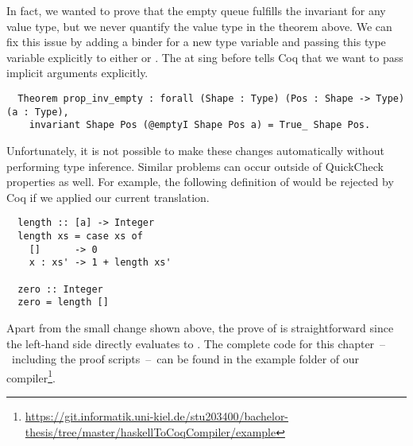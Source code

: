 In fact, we wanted to prove that the empty queue fulfills the invariant for any value type, but we never quantify the value type in the theorem above.
We can fix this issue by adding a binder for a new type variable and passing this type variable explicitly to either  or .
The at sing before  tells Coq that we want to pass implicit arguments explicitly.
\begin{verbatim}
  Theorem prop_inv_empty : forall (Shape : Type) (Pos : Shape -> Type) (a : Type),
    invariant Shape Pos (@emptyI Shape Pos a) = True_ Shape Pos.
\end{verbatim}
Unfortunately, it is not possible to make these changes automatically without performing type inference.
Similar problems can occur outside of QuickCheck properties as well.
For example, the following definition of  would be rejected by Coq if we applied our current translation.
\begin{verbatim}
  length :: [a] -> Integer
  length xs = case xs of
    []      -> 0
    x : xs' -> 1 + length xs'

  zero :: Integer
  zero = length []
\end{verbatim}
Apart from the small change shown above, the prove of  is straightforward since the left-hand side directly evaluates to .
The complete code for this chapter~--~including the proof scripts~--~can be found in the example folder of our compiler\footnote{\url{https://git.informatik.uni-kiel.de/stu203400/bachelor-thesis/tree/master/haskellToCoqCompiler/example}}.

